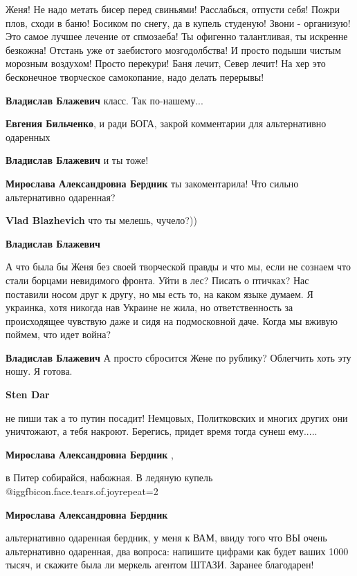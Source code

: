 \begin{itemize}

Женя! Не надо метать бисер перед свиньями! Расслабься, отпусти себя! Пожри
плов, сходи в баню! Босиком по снегу, да в купель студеную! Звони - организую!
Это самое лучшее лечение от спмозаеба! Ты офигенно талантливая, ты искренне
безкожна! Отстань уже от заебистого мозгодолбства! И просто подыши чистым
морозным воздухом! Просто перекури! Баня лечит, Север лечит! На хер это
бесконечное творческое самокопание, надо делать перерывы!

\begin{itemize} %
\textbf{Владислав Блажевич} класс. Так по-нашему...

\textbf{Евгения Бильченко}, и ради БОГА, закрой комментарии для альтернативно одаренных

\textbf{Владислав Блажевич} и ты тоже!

\textbf{Мирослава Александровна Бердник} ты закоментарила! Что сильно альтернативно одаренная?

\textbf{Vlad Blazhevich} что ты мелешь, чучело?))

\textbf{Владислав Блажевич} 

А что была бы Женя без своей творческой правды и что мы, если не сознаем что
стали борцами невидимого фронта. Уйти в лес? Писать о птичках? Нас поставили
носом друг к другу, но мы есть то, на каком языке думаем. Я украинка, хотя
никогда нав Украине не жила, но ответственность за происходящее чувствую даже и
сидя на подмосковной даче. Когда мы вживую поймем, что идет война?


\textbf{Владислав Блажевич} А просто сбросится Жене по рублику? Облегчить хоть эту ношу. Я готова.

\textbf{Sten Dar} 

не пиши так а то путин посадит! Немцовых, Политковских и многих других они
уничтожают, а тебя накроют. Берегись, придет время тогда сунеш ему.....

\textbf{Мирослава Александровна Бердник} , 

в Питер собирайся, набожная. В ледяную купель  @igg{fbicon.face.tears.of.joy}{repeat=2} 

\textbf{Мирослава Александровна Бердник} 

альтернативно одаренная бердник, у меня к ВАМ, ввиду того что ВЫ очень
альтернативно одаренная, два вопроса: напишите цифрами как будет ваших 1000
тысяч, и скажите была ли меркель агентом ШТАЗИ. Заранее благодарен!


\end{itemize}
\end{itemize}
